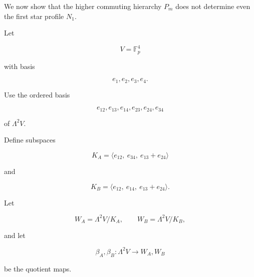 \documentclass[11pt]{article}
\begin{document}
We now show that the higher commuting hierarchy $P_m$ does not determine even the first star profile $N_1$.

Let

\[
V=\mathbb F_p^4
\]

with basis

\[
e_1,e_2,e_3,e_4.
\]

Use the ordered basis

\[
e_{12},e_{13},e_{14},e_{23},e_{24},e_{34}
\]

of $\Lambda^2V$.

Define subspaces

\[
K_A=
\langle
e_{12},\ e_{34},\ e_{13}+e_{24}
\rangle
\]

and

\[
K_B=
\langle
e_{12},\ e_{14},\ e_{13}+e_{24}
\rangle.
\]

Let

\[
W_A=\Lambda^2V/K_A,
\qquad
W_B=\Lambda^2V/K_B,
\]

and let

\[
\beta_A,\beta_B:\Lambda^2V\to W_A,W_B
\]

be the quotient maps.
\end{document}
